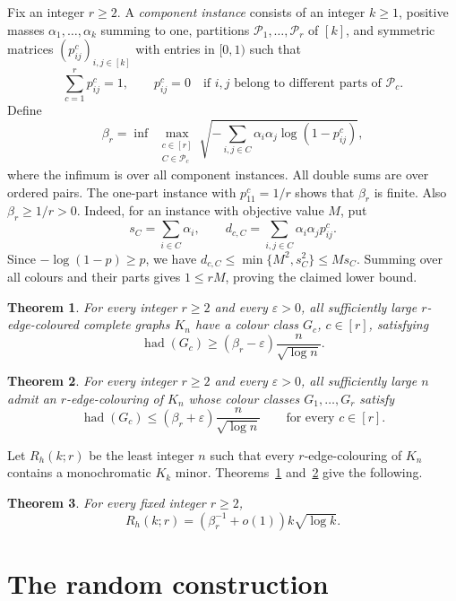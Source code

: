 \documentclass[11pt]{article}
\newtheorem{theorem}{Theorem}
\newcommand{\had}{\operatorname{had}}
\newcommand{\PP}{\mathcal P}
\begin{document}
Fix an integer $r\geq2$. A \emph{component instance} consists of an integer
$k\geq1$, positive masses $\alpha_1,\ldots,\alpha_k$ summing to one,
partitions $\PP_1,\ldots,\PP_r$ of $[k]$, and symmetric matrices
$(p^c_{ij})_{i,j\in[k]}$ with entries in $[0,1)$ such that
\[
 \sum_{c=1}^r p^c_{ij}=1,
 \qquad
 p^c_{ij}=0\quad\text{if $i,j$ belong to different parts of $\PP_c$}.
\]
Define
\begin{equation}\label{eq:program}
 \beta_r=\inf\;\max_{\substack{c\in[r]\\ C\in\PP_c}}
       \sqrt{-\sum_{i,j\in C}\alpha_i\alpha_j\log(1-p^c_{ij})},
\end{equation}
where the infimum is over all component instances. All double sums are over
ordered pairs. The one-part instance with $p^c_{11}=1/r$ shows that $\beta_r$ is
finite. Also $\beta_r\geq1/r>0$. Indeed, for an instance with objective
value $M$, put
\[
 s_C=\sum_{i\in C}\alpha_i,\qquad
 d_{c,C}=\sum_{i,j\in C}\alpha_i\alpha_jp^c_{ij}.
\]
Since $-\log(1-p)\geq p$, we have
$d_{c,C}\leq\min\{M^2,s_C^2\}\leq Ms_C$. Summing over all colours and
their parts gives $1\leq rM$, proving the claimed lower bound.

\begin{theorem}\label{thm:transfer}
For every integer $r\geq2$ and every $\varepsilon>0$, all sufficiently large
$r$-edge-coloured complete graphs $K_n$ have a colour class $G_c$, $c\in[r]$, satisfying
\[
 \had(G_c)\geq(\beta_r-\varepsilon)\frac{n}{\sqrt{\log n}}.
\]
\end{theorem}

\begin{theorem}\label{thm:construction}
For every integer $r\geq2$ and every $\varepsilon>0$, all sufficiently large
$n$ admit an $r$-edge-colouring of $K_n$ whose colour classes $G_1,\ldots,G_r$
satisfy
\[
 \had(G_c)\leq(\beta_r+\varepsilon)\frac{n}{\sqrt{\log n}}
 \qquad\text{for every }c\in[r].
\]
\end{theorem}

Let $R_h(k;r)$ be the least integer $n$ such that every $r$-edge-colouring
of $K_n$ contains a monochromatic $K_k$ minor.
Theorems~\ref{thm:transfer} and~\ref{thm:construction} give the following.

\begin{theorem}\label{thm:ramsey}
For every fixed integer $r\geq2$,
\[
 R_h(k;r)=\left(\beta_r^{-1}+o(1)\right)k\sqrt{\log k}.
\]
\end{theorem}

\section{The random construction}
\end{document}
